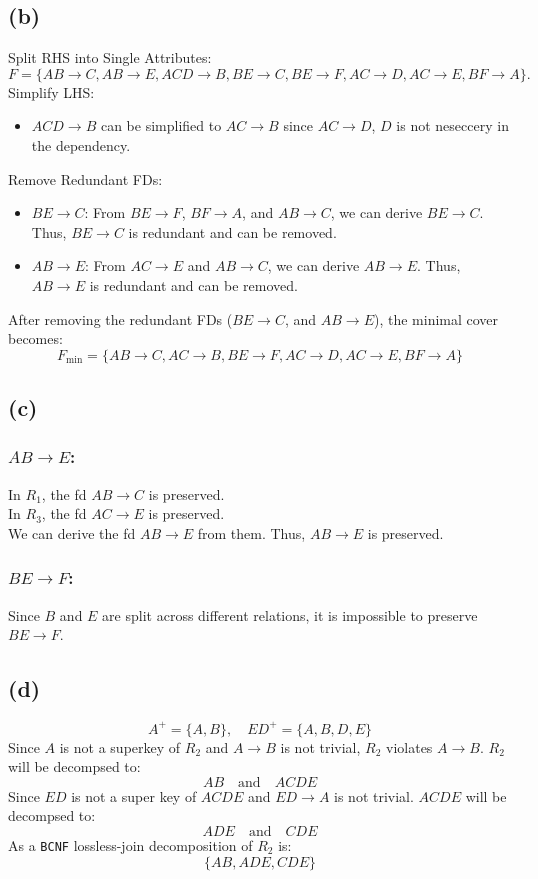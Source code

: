 \documentclass{article}
\begin{document}
\subsection*{(b)}
Split RHS into Single Attributes:
$$
  F = \{ AB \to C, AB \to E, ACD \to B, BE \to C, BE \to F, AC \to D, AC \to E, BF \to A \}.
$$
Simplify LHS:
\begin{itemize}
  \item $ACD \to B$ can be simplified to $AC \to B$ since $AC \to D$, $D$ is not neseccery in the dependency.
\end{itemize}
Remove Redundant FDs:
\begin{itemize}
  \item $ BE \to C $: From $ BE \to F $, $ BF \to A $, and $ AB \to C $, we can derive $ BE \to C $. Thus, $ BE \to C $ is redundant and can be removed.
  \item $ AB \to E $: From $ AC \to E $ and $ AB \to C $, we can derive $ AB \to E $. Thus, $ AB \to E $ is redundant and can be removed.
\end{itemize}
After removing the redundant FDs ($ BE \to C $, and $ AB \to E $), the minimal cover becomes:
$$
  \boxed{F_{\text{min}} = \{ AB \to C, AC \to B, BE \to F, AC \to D, AC \to E, BF \to A \}}
$$
\newpage
\subsection*{(c)}
\subsubsection*{$AB\to E$:}
In $R_1$, the fd $AB\to C$ is preserved.\\
In $R_3$, the fd $AC\to E$ is preserved.\\
We can derive the fd $AB\to E$ from them. Thus, $AB\to E$ is preserved.
\subsubsection*{$BE\to F$:}
Since $B$ and $E$ are split across different relations, it is impossible to preserve $BE\to F$.

\subsection*{(d)}
$$A^+=\{A,B\},\quad ED^+=\{A,B,D,E\}$$
Since $A$ is not a superkey of $R_2$ and $A\to B$ is not trivial, $R_2$ violates $A\to B$. $R_2$ will be decompsed to:
$$AB\quad\text{and}\quad ACDE$$
Since $ED$ is not a super key of $ACDE$ and $ED\to A$ is not trivial. $ACDE$ will be decompsed to:
$$ADE\quad\text{and}\quad CDE$$
As a \texttt{BCNF} lossless-join decomposition of $R_2$ is:
$$\boxed{\{AB, ADE, CDE\}}$$
\newpage
\end{document}
